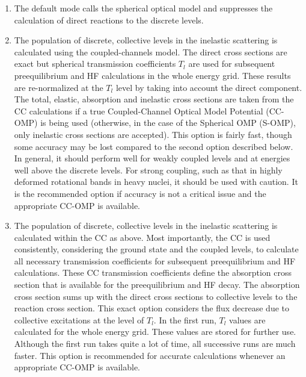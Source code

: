 \begin{enumerate}
\item The default mode calls the spherical optical model and suppresses the
calculation of direct reactions to the discrete levels.

\item The population of discrete, collective levels in the inelastic
scattering is calculated using the coupled-channels model. The direct cross
sections are exact but spherical transmission coefficients $T_{l}$ are used
for subsequent preequilibrium and HF calculations in the whole energy grid.
These results are re-normalized at the $T_{l}$ level by taking into account
the direct component. The total, elastic, absorption and inelastic cross
sections are taken from the CC calculations if a true Coupled-Channel
Optical Model Potential (CC-OMP) is being used (otherwise, in the case of
the Spherical OMP (S-OMP), only inelastic cross sections are accepted). This
option is fairly fast, though some accuracy may be lost compared to the
second option described below. In general, it should perform well for weakly
coupled levels and at energies well above the discrete levels. For strong
coupling, such as that in highly deformed rotational bands in heavy nuclei,
it should be used with caution. It is the recommended option if accuracy is
not a critical issue and the appropriate CC-OMP is available.

\item The population of discrete, collective levels in the inelastic
scattering is calculated within the CC as above. Most importantly, the CC is
used consistently, considering the ground state and the coupled levels, to
calculate all necessary transmission coefficients for subsequent
preequilibrium and HF calculations. These CC transmission coefficients
define the absorption cross section that is available for the preequilibrium
and HF decay. The absorption cross section sums up with the direct cross
sections to collective levels to the reaction cross section. This exact
option considers the flux decrease due to collective excitations at the
level of $T_{l}$. In the first run, $T_{l}$ values are calculated for the
whole energy grid. These values are stored for further use. Although the
first run takes quite a lot of time, all successive runs are much faster.
This option is recommended for accurate calculations whenever an appropriate
CC-OMP is available.


\end{enumerate}
